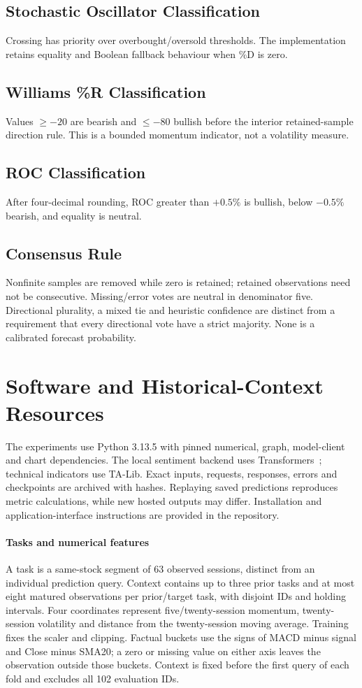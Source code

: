 \subsection{Stochastic Oscillator Classification}
Crossing has priority over overbought/oversold thresholds. The implementation retains equality and Boolean fallback behaviour when \%D is zero.
\subsection{Williams \%R Classification}
Values $\ge-20$ are bearish and $\le-80$ bullish before the interior retained-sample direction rule. This is a bounded momentum indicator, not a volatility measure.
\subsection{ROC Classification}
After four-decimal rounding, ROC greater than $+0.5\%$ is bullish, below $-0.5\%$ bearish, and equality is neutral.
\subsection{Consensus Rule}
Nonfinite samples are removed while zero is retained; retained observations need not be consecutive. Missing/error votes are neutral in denominator five. Directional plurality, a mixed tie and heuristic confidence are distinct from a requirement that every directional vote have a strict majority. None is a calibrated forecast probability.

\section{Software and Historical-Context Resources}
\label{app:software}
The experiments use Python 3.13.5 with pinned numerical, graph, model-client and chart dependencies. The local sentiment backend uses Transformers~\cite{wolf2020transformers}; technical indicators use TA-Lib. Exact inputs, requests, responses, errors and checkpoints are archived with hashes. Replaying saved predictions reproduces metric calculations, while new hosted outputs may differ. Installation and application-interface instructions are provided in the repository.

\paragraph{Tasks and numerical features}
A task is a same-stock segment of 63 observed sessions, distinct from an individual prediction query. Context contains up to three prior tasks and at most eight matured observations per prior/target task, with disjoint IDs and holding intervals. Four coordinates represent five/twenty-session momentum, twenty-session volatility and distance from the twenty-session moving average. Training fixes the scaler and clipping. Factual buckets use the signs of MACD minus signal and Close minus SMA20; a zero or missing value on either axis leaves the observation outside those buckets. Context is fixed before the first query of each fold and excludes all 102 evaluation IDs.

